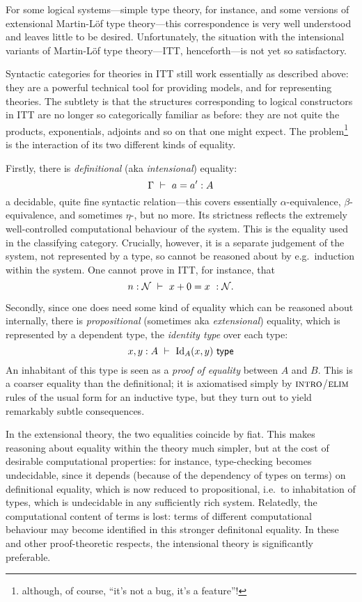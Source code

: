 \begin{para}
For some logical systems---simple type theory, for instance, and some versions of extensional Martin-Löf type theory---this correspondence is very well understood and leaves little to be desired.  Unfortunately, the situation with the intensional variants of Martin-Löf type theory---ITT, henceforth---is not yet so satisfactory.

Syntactic categories for theories in ITT still work essentially as described above: they are a powerful technical tool for providing models, and for representing theories.  The subtlety is that the structures corresponding to logical constructors in ITT are no longer so categorically familiar as before: they are not quite the products, exponentials, adjoints and so on that one might expect.  The problem\footnote{although, of course, ``it's not a bug, it's a feature''!} is the interaction of its two different kinds of equality.

Firstly, there is \emph{definitional} (aka \emph{intensional}) equality:
\[\Gamma\ \vdash\ a = a' : A\]
a decidable, quite fine syntactic relation---this covers essentially $\alpha$-equivalence, $\beta$-equivalence, and sometimes $\eta$-, but no more.  Its strictness reflects the extremely well-controlled computational behaviour of the system.  This is the equality used in the classifying category.  Crucially, however, it is a separate judgement of the system, not represented by a type, so cannot be reasoned about by e.g.\ induction within the system.  One cannot prove in ITT, for instance, that 
\[n : \mathcal{N}\ \vdash\ x+0 = x\ : \mathcal{N}. \]

Secondly, since one does need some kind of equality which can be reasoned about internally, there is \emph{propositional} (sometimes aka \emph{extensional}) equality, which is represented by a dependent type, the \emph{identity type} over each type:
\[ x, y : A\ \vdash\ \mathrm{Id}_A(x,y)\ \mathsf{type}\]
An inhabitant of this type is seen as a \emph{proof of equality} between $A$ and $B$.  This is a coarser equality than the definitional; it is axiomatised simply by $\textsc{intro}$/$\textsc{elim}$ rules of the usual form for an inductive type, but they turn out to yield remarkably subtle consequences.

In the extensional theory, the two equalities coincide by fiat.  This makes reasoning about equality within the theory much simpler, but at the cost of desirable computational properties: for instance, type-checking becomes undecidable, since it depends (because of the dependency of types on terms) on definitional equality, which is now reduced to propositional, i.e.\ to inhabitation of types, which is undecidable in any sufficiently rich system.  Relatedly, the computational content of terms is lost: terms of different computational behaviour may become identified in this stronger definitonal equality.  In these and other proof-theoretic respects, the intensional theory is significantly preferable.


\end{para}
